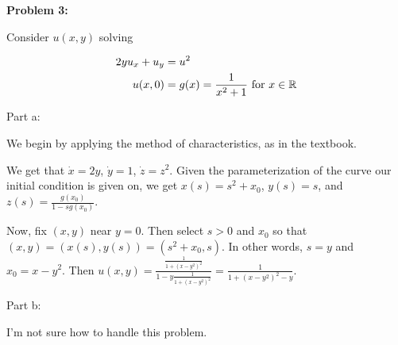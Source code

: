 \documentclass[a4paper,12pt]{article}
\begin{document}
{\bf Problem 3:}

Consider $u(x,y)$ solving

\begin{align*}
2yu_x + u_y &= u^2\\
u(x,0)&= g(x) = \frac{1}{x^2+1} \text{ for } x \in \mathbb{R}
\end{align*}

Part a:

We begin by applying the method of characteristics, as in the textbook.

We get that $\dot{x} = 2y$, $\dot{y} = 1$, $\dot{z} = z^2$. Given the parameterization of the curve our initial condition is given on, we get $x(s) = s^2+x_0$, $y(s) = s$, and $z(s) = \frac{g(x_0)}{1-sg(x_0)}$.

Now, fix $(x,y)$ near $y=0$. Then select $s>0$ and $x_0$ so that $(x,y) = (x(s),y(s)) = (s^2+x_0,s)$. In other words, $s=y$ and $x_0 = x-y^2$. Then $u(x,y) = \frac{\frac{1}{1+(x-y^2)^2}}{1-y\frac{1}{1+(x-y^2)^2}} = \frac{1}{1+(x-y^2)^2 -y}$.

\shunt

Part b:

I'm not sure how to handle this problem. 

\shunt
\end{document}
